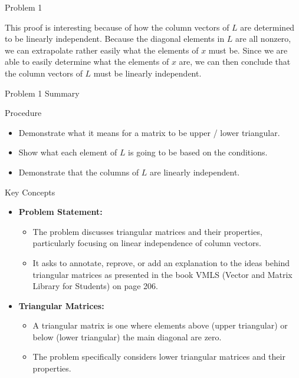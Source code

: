 \begin{problem}{Problem 1}
\begin{highlight}[Solution]
        This proof is interesting because of how the column vectors of $L$ are determined to be linearly independent. Because the diagonal elements in $L$ are all nonzero, we can extrapolate rather easily
        what the elements of $x$ must be. Since we are able to easily determine what the elements of $x$ are, we can then conclude that the column vectors of $L$ must be linearly independent.
    \end{highlight}
\end{problem}

\begin{summary}{Problem 1 Summary}
    \begin{statement}{Procedure}
        \begin{itemize}
            \item Demonstrate what it means for a matrix to be upper / lower triangular.
            \item Show what each element of $L$ is going to be based on the conditions.
            \item Demonstrate that the columns of $L$ are linearly independent.
        \end{itemize}
    \end{statement}
    \begin{statement}{Key Concepts}
        \begin{itemize}
            \item \textbf{Problem Statement:}
            \begin{itemize}
                \item The problem discusses triangular matrices and their properties, particularly focusing on linear independence of column vectors.
                \item It asks to annotate, reprove, or add an explanation to the ideas behind triangular matrices as presented in the book VMLS (Vector and Matrix Library for Students) on page 206.
            \end{itemize}
            \item \textbf{Triangular Matrices:}
            \begin{itemize}
                \item A triangular matrix is one where elements above (upper triangular) or below (lower triangular) the main diagonal are zero.
                \item The problem specifically considers lower triangular matrices and their properties.
            \end{itemize}

\end{itemize}
\end{statement}
\end{summary}
